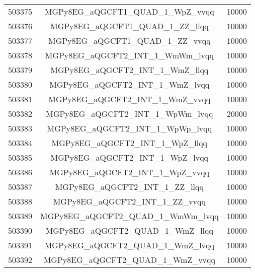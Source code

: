\begin{table}[!htbp]
\begin{center}
\begin{tabular}{c|c|c}
503375 & MGPy8EG\_aQGCFT1\_QUAD\_1\_WpZ\_vvqq    & 10000 \\
503376 & MGPy8EG\_aQGCFT1\_QUAD\_1\_ZZ\_llqq     & 10000 \\
503377 & MGPy8EG\_aQGCFT1\_QUAD\_1\_ZZ\_vvqq     & 10000 \\
503378 & MGPy8EG\_aQGCFT2\_INT\_1\_WmWm\_lvqq    & 10000 \\
503379 & MGPy8EG\_aQGCFT2\_INT\_1\_WmZ\_llqq     & 10000 \\
503380 & MGPy8EG\_aQGCFT2\_INT\_1\_WmZ\_lvqq     & 10000 \\
503381 & MGPy8EG\_aQGCFT2\_INT\_1\_WmZ\_vvqq     & 10000 \\
503382 & MGPy8EG\_aQGCFT2\_INT\_1\_WpWm\_lvqq    & 20000 \\
503383 & MGPy8EG\_aQGCFT2\_INT\_1\_WpWp\_lvqq    & 10000 \\
503384 & MGPy8EG\_aQGCFT2\_INT\_1\_WpZ\_llqq     & 10000 \\
503385 & MGPy8EG\_aQGCFT2\_INT\_1\_WpZ\_lvqq     & 10000 \\
503386 & MGPy8EG\_aQGCFT2\_INT\_1\_WpZ\_vvqq     & 10000 \\
503387 & MGPy8EG\_aQGCFT2\_INT\_1\_ZZ\_llqq      & 10000 \\
503388 & MGPy8EG\_aQGCFT2\_INT\_1\_ZZ\_vvqq      & 10000 \\
503389 & MGPy8EG\_aQGCFT2\_QUAD\_1\_WmWm\_lvqq   & 10000 \\
503390 & MGPy8EG\_aQGCFT2\_QUAD\_1\_WmZ\_llqq    & 10000 \\
503391 & MGPy8EG\_aQGCFT2\_QUAD\_1\_WmZ\_lvqq    & 10000 \\
503392 & MGPy8EG\_aQGCFT2\_QUAD\_1\_WmZ\_vvqq    & 10000 \\


\hline
\end{tabular}
\label{tabular:mc_samples_aqgc_6}
\end{center}
\end{table}


